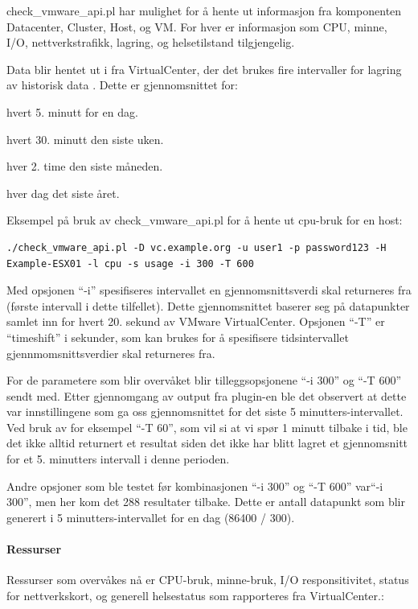 check\_vmware\_api.pl har mulighet for å hente ut informasjon fra komponenten Datacenter, Cluster, Host, og VM. For hver er informasjon som CPU, minne, I/O, nettverkstrafikk, lagring, og helsetilstand tilgjengelig.

Data blir hentet ut i fra VirtualCenter, der det brukes fire intervaller for lagring av historisk data \cite{vmwareperf}. Dette er gjennomsnittet for:
\begin{enumerate*}
        \item hvert 5. minutt for en dag.
        \item hvert 30. minutt den siste uken.
        \item hver 2. time den siste måneden.
        \item hver dag det siste året.
\end{enumerate*}

Eksempel på bruk av check\_vmware\_api.pl for å hente ut cpu-bruk for en host:
\begin{lstlisting}[style=example]
./check_vmware_api.pl -D vc.example.org -u user1 -p password123 -H Example-ESX01 -l cpu -s usage -i 300 -T 600
\end{lstlisting}

Med opsjonen ``-i'' spesifiseres intervallet en gjennomsnittsverdi skal returneres fra (første intervall i dette tilfellet). Dette gjennomsnittet baserer seg på datapunkter samlet inn for hvert 20. sekund av VMware VirtualCenter. Opsjonen ``-T''  er ``timeshift'' i sekunder, som kan brukes for å spesifisere tidsintervallet gjennmomsnittsverdier skal returneres fra. 

For de parametere som blir overvåket blir tilleggsopsjonene ``-i 300'' og ``-T 600'' sendt med. Etter gjennomgang av output fra plugin-en ble det observert at dette var innstillingene som ga oss gjennomsnittet for det siste 5 minutters-intervallet. Ved bruk av for eksempel ``-T 60'', som vil si at vi spør 1 minutt tilbake i tid, ble det ikke alltid returnert et resultat siden det ikke har blitt lagret et gjennomsnitt for et 5. minutters intervall i denne perioden. 

Andre opsjoner som ble testet før kombinasjonen ``-i 300'' og ``-T 600'' var``-i 300'', men her kom det 288 resultater tilbake. Dette er antall datapunkt som blir generert i 5 minutters-intervallet for en dag (86400 / 300).
\paragraph{Ressurser}
Ressurser som overvåkes nå er CPU-bruk, minne-bruk, I/O responsitivitet, status for nettverkskort, og generell helsestatus som rapporteres fra VirtualCenter.\cite{ciscovirtual,vmwaremonitoring}:


